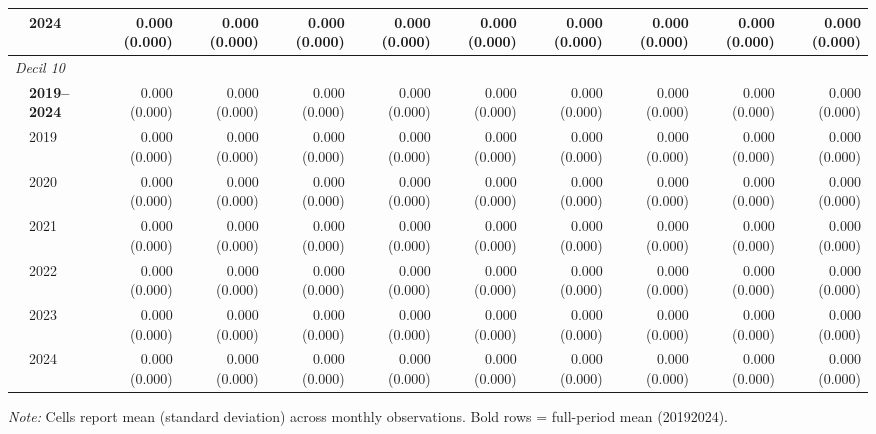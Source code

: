 \begin{table}[htbp]
\begin{tabular}{llrrrrrrrrr}
 & 2024 & 0.000 (0.000) & 0.000 (0.000) & 0.000 (0.000) & 0.000 (0.000) & 0.000 (0.000) & 0.000 (0.000) & 0.000 (0.000) & 0.000 (0.000) & 0.000 (0.000) \\
\midrule
\multicolumn{11}{l}{\textit{Decil 10}} \\
 & \textbf{2019–2024} & 0.000 (0.000) & 0.000 (0.000) & 0.000 (0.000) & 0.000 (0.000) & 0.000 (0.000) & 0.000 (0.000) & 0.000 (0.000) & 0.000 (0.000) & 0.000 (0.000) \\
 & 2019 & 0.000 (0.000) & 0.000 (0.000) & 0.000 (0.000) & 0.000 (0.000) & 0.000 (0.000) & 0.000 (0.000) & 0.000 (0.000) & 0.000 (0.000) & 0.000 (0.000) \\
 & 2020 & 0.000 (0.000) & 0.000 (0.000) & 0.000 (0.000) & 0.000 (0.000) & 0.000 (0.000) & 0.000 (0.000) & 0.000 (0.000) & 0.000 (0.000) & 0.000 (0.000) \\
 & 2021 & 0.000 (0.000) & 0.000 (0.000) & 0.000 (0.000) & 0.000 (0.000) & 0.000 (0.000) & 0.000 (0.000) & 0.000 (0.000) & 0.000 (0.000) & 0.000 (0.000) \\
 & 2022 & 0.000 (0.000) & 0.000 (0.000) & 0.000 (0.000) & 0.000 (0.000) & 0.000 (0.000) & 0.000 (0.000) & 0.000 (0.000) & 0.000 (0.000) & 0.000 (0.000) \\
 & 2023 & 0.000 (0.000) & 0.000 (0.000) & 0.000 (0.000) & 0.000 (0.000) & 0.000 (0.000) & 0.000 (0.000) & 0.000 (0.000) & 0.000 (0.000) & 0.000 (0.000) \\
 & 2024 & 0.000 (0.000) & 0.000 (0.000) & 0.000 (0.000) & 0.000 (0.000) & 0.000 (0.000) & 0.000 (0.000) & 0.000 (0.000) & 0.000 (0.000) & 0.000 (0.000) \\
\bottomrule
\end{tabular}
\begin{minipage}{\linewidth}
\vspace{2pt}\footnotesize
\textit{Note:} Cells report mean (standard deviation) across monthly observations. Bold rows = full-period mean (2019\textendash{}2024).
\end{minipage}
\end{table}
